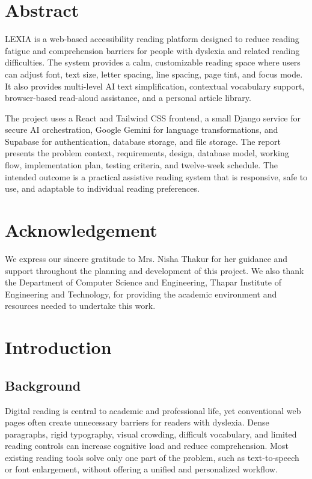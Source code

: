 \documentclass[a4paper]{tietreport}
\author{%
  \texttt{1024170445} \quad Nandini Sharma, CSED \\
  \texttt{1024170435} \quad Divyadeep Singh, CSED%
}
\begin{document}
\maketitle

\chapter*{Abstract}
LEXIA is a web-based accessibility reading platform designed to reduce reading fatigue and comprehension barriers for people with dyslexia and related reading difficulties. The system provides a calm, customizable reading space where users can adjust font, text size, letter spacing, line spacing, page tint, and focus mode. It also provides multi-level AI text simplification, contextual vocabulary support, browser-based read-aloud assistance, and a personal article library.

The project uses a React and Tailwind CSS frontend, a small Django service for secure AI orchestration, Google Gemini for language transformations, and Supabase for authentication, database storage, and file storage. The report presents the problem context, requirements, design, database model, working flow, implementation plan, testing criteria, and twelve-week schedule. The intended outcome is a practical assistive reading system that is responsive, safe to use, and adaptable to individual reading preferences.

\chapter*{Acknowledgement}
We express our sincere gratitude to Mrs. Nisha Thakur for her guidance and support throughout the planning and development of this project. We also thank the Department of Computer Science and Engineering, Thapar Institute of Engineering and Technology, for providing the academic environment and resources needed to undertake this work.

\tableofcontents
\clearpage
{}

\chapter{Introduction}
\section{Background}
Digital reading is central to academic and professional life, yet conventional web pages often create unnecessary barriers for readers with dyslexia. Dense paragraphs, rigid typography, visual crowding, difficult vocabulary, and limited reading controls can increase cognitive load and reduce comprehension. Most existing reading tools solve only one part of the problem, such as text-to-speech or font enlargement, without offering a unified and personalized workflow.
\end{document}
